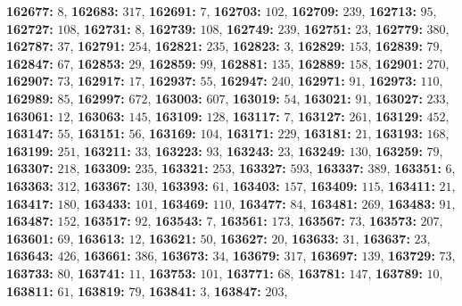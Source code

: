 \textsf{\bfseries 162677:} $8$, \textsf{\bfseries 162683:} $317$, \textsf{\bfseries 162691:} $7$, \textsf{\bfseries 162703:} $102$, \textsf{\bfseries 162709:} $239$, \textsf{\bfseries 162713:} $95$, \textsf{\bfseries 162727:} $108$, \textsf{\bfseries 162731:} $8$, \textsf{\bfseries 162739:} $108$, \textsf{\bfseries 162749:} $239$, \textsf{\bfseries 162751:} $23$, \textsf{\bfseries 162779:} $380$, \textsf{\bfseries 162787:} $37$, \textsf{\bfseries 162791:} $254$, \textsf{\bfseries 162821:} $235$, \textsf{\bfseries 162823:} $3$, \textsf{\bfseries 162829:} $153$, \textsf{\bfseries 162839:} $79$, \textsf{\bfseries 162847:} $67$, \textsf{\bfseries 162853:} $29$, \textsf{\bfseries 162859:} $99$, \textsf{\bfseries 162881:} $135$, \textsf{\bfseries 162889:} $158$, \textsf{\bfseries 162901:} $270$, \textsf{\bfseries 162907:} $73$, \textsf{\bfseries 162917:} $17$, \textsf{\bfseries 162937:} $55$, \textsf{\bfseries 162947:} $240$, \textsf{\bfseries 162971:} $91$, \textsf{\bfseries 162973:} $110$, \textsf{\bfseries 162989:} $85$, \textsf{\bfseries 162997:} $672$, \textsf{\bfseries 163003:} $607$, \textsf{\bfseries 163019:} $54$, \textsf{\bfseries 163021:} $91$, \textsf{\bfseries 163027:} $233$, \textsf{\bfseries 163061:} $12$, \textsf{\bfseries 163063:} $145$, \textsf{\bfseries 163109:} $128$, \textsf{\bfseries 163117:} $7$, \textsf{\bfseries 163127:} $261$, \textsf{\bfseries 163129:} $452$, \textsf{\bfseries 163147:} $55$, \textsf{\bfseries 163151:} $56$, \textsf{\bfseries 163169:} $104$, \textsf{\bfseries 163171:} $229$, \textsf{\bfseries 163181:} $21$, \textsf{\bfseries 163193:} $168$, \textsf{\bfseries 163199:} $251$, \textsf{\bfseries 163211:} $33$, \textsf{\bfseries 163223:} $93$, \textsf{\bfseries 163243:} $23$, \textsf{\bfseries 163249:} $130$, \textsf{\bfseries 163259:} $79$, \textsf{\bfseries 163307:} $218$, \textsf{\bfseries 163309:} $235$, \textsf{\bfseries 163321:} $253$, \textsf{\bfseries 163327:} $593$, \textsf{\bfseries 163337:} $389$, \textsf{\bfseries 163351:} $6$, \textsf{\bfseries 163363:} $312$, \textsf{\bfseries 163367:} $130$, \textsf{\bfseries 163393:} $61$, \textsf{\bfseries 163403:} $157$, \textsf{\bfseries 163409:} $115$, \textsf{\bfseries 163411:} $21$, \textsf{\bfseries 163417:} $180$, \textsf{\bfseries 163433:} $101$, \textsf{\bfseries 163469:} $110$, \textsf{\bfseries 163477:} $84$, \textsf{\bfseries 163481:} $269$, \textsf{\bfseries 163483:} $91$, \textsf{\bfseries 163487:} $152$, \textsf{\bfseries 163517:} $92$, \textsf{\bfseries 163543:} $7$, \textsf{\bfseries 163561:} $173$, \textsf{\bfseries 163567:} $73$, \textsf{\bfseries 163573:} $207$, \textsf{\bfseries 163601:} $69$, \textsf{\bfseries 163613:} $12$, \textsf{\bfseries 163621:} $50$, \textsf{\bfseries 163627:} $20$, \textsf{\bfseries 163633:} $31$, \textsf{\bfseries 163637:} $23$, \textsf{\bfseries 163643:} $426$, \textsf{\bfseries 163661:} $386$, \textsf{\bfseries 163673:} $34$, \textsf{\bfseries 163679:} $317$, \textsf{\bfseries 163697:} $139$, \textsf{\bfseries 163729:} $73$, \textsf{\bfseries 163733:} $80$, \textsf{\bfseries 163741:} $11$, \textsf{\bfseries 163753:} $101$, \textsf{\bfseries 163771:} $68$, \textsf{\bfseries 163781:} $147$, \textsf{\bfseries 163789:} $10$, \textsf{\bfseries 163811:} $61$, \textsf{\bfseries 163819:} $79$, \textsf{\bfseries 163841:} $3$, \textsf{\bfseries 163847:} $203$, 
